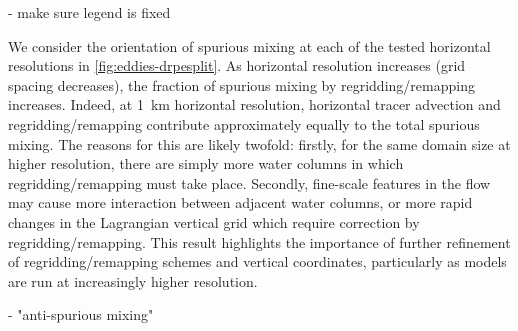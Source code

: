 - make sure legend is fixed

We consider the orientation of spurious mixing at each of the tested horizontal resolutions in \cref{fig:eddies-drpesplit}. As horizontal resolution increases (grid spacing decreases), the fraction of spurious mixing by regridding/remapping increases. Indeed, at \SI{1}{\kilo\metre} horizontal resolution, horizontal tracer advection and regridding/remapping contribute approximately equally to the total spurious mixing. The reasons for this are likely twofold: firstly, for the same domain size at higher resolution, there are simply more water columns in which regridding/remapping must take place. Secondly, fine-scale features in the flow may cause more interaction between adjacent water columns, or more rapid changes in the Lagrangian vertical grid which require correction by regridding/remapping. This result highlights the importance of further refinement of regridding/remapping schemes and vertical coordinates, particularly as models are run at increasingly higher resolution.

- "anti-spurious mixing"

